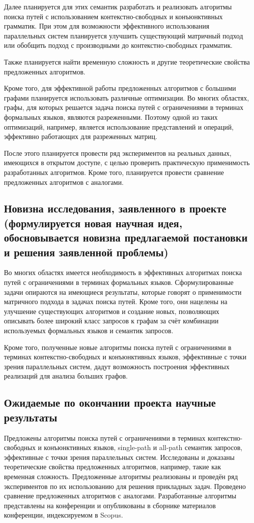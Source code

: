 \documentclass[12pt]{article}  %
\theoremstyle{remark}
\begin{document}
Далее планируется для этих семантик разработать и реализовать алгоритмы поиска путей с использованием контекстно-свободных и конъюнктивных грамматик. При этом для возможности эффективного использования параллельных систем планируется улучшить существующий матричный подход или обобщить подход с производными до контекстно-свободных грамматик.

Также планируется найти временную сложность и другие теоретические свойства предложенных алгоритмов.

Кроме того, для эффективной работы предложенных алгоритмов с большими графами планируется использовать различные оптимизации. Во многих областях, графы, для которых решается задача поиска путей с ограничениями в терминах формальных языков, являются разреженными. Поэтому одной из таких оптимизаций, например, является использование представлений и операций, эффективно работающих для разреженных матриц.

После этого планируется провести ряд экспериментов на реальных данных, имеющихся в открытом доступе, с целью проверить практическую применимость разработанных алгоритмов. Кроме того, планируется провести сравнение предложенных алгоритмов с аналогами.

\subsection{Новизна исследования, заявленного в проекте (формулируется новая научная идея, обосновывается новизна предлагаемой постановки и решения заявленной проблемы)}
Во многих областях имеется необходимость в эффективных алгоритмах поиска путей с ограничениями в терминах формальных языков. Сформулированные задачи опираются на имеющиеся результаты, которые говорят о применимости матричного подхода в задачах поиска путей. Кроме того, они нацелены на улучшение существующих алгоритмов и создание новых, позволяющих описывать более широкий класс запросов к графам за счёт комбинации используемых формальных языков и семантик запросов.

Кроме того, полученные новые алгоритмы поиска путей с ограничениями в терминах контекстно-свободных и конъюнктивных языков, эффективные с точки зрения параллельных систем, дадут возможность построения эффективных реализаций для анализа больших графов.

\subsection{Ожидаемые по окончании проекта научные результаты}
Предложены алгоритмы поиска путей с ограничениями в терминах контекстно-свободных и конъюнктивных языков, single-path и all-path семантик запросов, эффективные с точки зрения параллельных систем. Исследованы и доказаны теоретические свойства предложенных алгоритмов, например, такие как временная сложность. Предложенные алгоритмы реализованы и проведён ряд экспериментов по их использованию для решения прикладных задач. Проведено сравнение предложенных алгоритмов с аналогами. Разработанные алгоритмы представлены на конференции и опубликованы в сборнике материалов конференции, индексируемом в Scopus.
\end{document}
